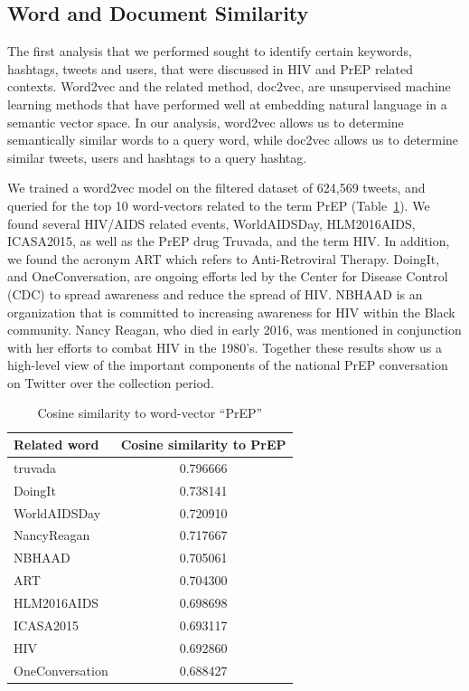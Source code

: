 \documentclass[conference]{IEEEtran}
\begin{document}
\subsection{Word and Document Similarity}

The first analysis that we performed sought to identify certain keywords, hashtags, tweets and users, that were discussed in HIV and PrEP related contexts. Word2vec and the related method, doc2vec, are unsupervised machine learning methods that have performed well at embedding natural language in a semantic vector space. In our analysis, word2vec allows us to determine semantically similar words to a query word, while doc2vec allows us to determine similar tweets, users and hashtags to a query hashtag.

We trained a word2vec model on the filtered dataset of 624,569 tweets, and queried for the top 10 word-vectors related to the term PrEP (Table~\ref{tbl:w2v}). We found several HIV/AIDS related events, WorldAIDSDay, HLM2016AIDS, ICASA2015, as well as the PrEP drug Truvada, and the term HIV. In addition, we found the acronym ART which refers to Anti-Retroviral Therapy. DoingIt, and OneConversation, are ongoing efforts led by the Center for Disease Control (CDC) to spread awareness and reduce the spread of HIV. NBHAAD is an organization that is committed to increasing awareness for HIV within the Black community. Nancy Reagan, who died in early 2016, was mentioned in conjunction with her efforts to combat HIV in the 1980's. Together these results show us a high-level view of the important components of the national PrEP conversation on Twitter over the collection period.

\begin{table}
\centering
\caption{Cosine similarity to word-vector ``PrEP''}
\begin{tabular}{|l|c|} \hline
Related word & Cosine similarity to PrEP\\ \hline
truvada & 0.796666\\ \hline
DoingIt & 0.738141\\ \hline
WorldAIDSDay & 0.720910\\ \hline
NancyReagan & 0.717667\\ \hline
NBHAAD & 0.705061\\ \hline
ART & 0.704300\\ \hline
HLM2016AIDS & 0.698698\\ \hline
ICASA2015 & 0.693117\\ \hline
HIV & 0.692860\\ \hline
OneConversation & 0.688427\\ \hline
\hline\end{tabular}
\label{tbl:w2v}
\end{table}
\end{document}
